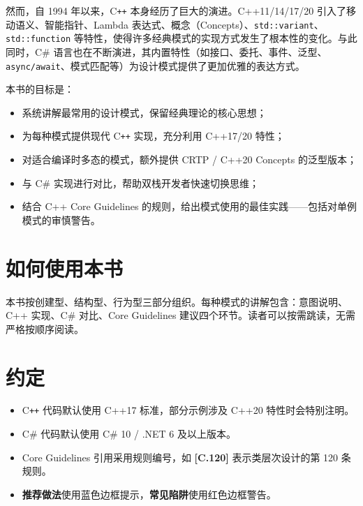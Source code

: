 \documentclass[12pt,a4paper,fontset=fandol]{ctexbook}
\newcommand{\guideref}[1]{\textbf{\textcolor{blue!70!black}{[#1]}}}
\begin{document}
然而，自 1994 年以来，C\texttt{++} 本身经历了巨大的演进。C++11/14/17/20 引入了移动语义、智能指针、Lambda 表达式、概念（Concepts）、\texttt{std::variant}、\texttt{std::function} 等特性，使得许多经典模式的实现方式发生了根本性的变化。与此同时，C\# 语言也在不断演进，其内置特性（如接口、委托、事件、泛型、\texttt{async/await}、模式匹配等）为设计模式提供了更加优雅的表达方式。

本书的目标是：

\begin{itemize}
  \item 系统讲解最常用的设计模式，保留经典理论的核心思想；
  \item 为每种模式提供现代 C\texttt{++} 实现，充分利用 C++17/20 特性；
  \item 对适合编译时多态的模式，额外提供 CRTP / C++20 Concepts 的泛型版本；
  \item 与 C\# 实现进行对比，帮助双栈开发者快速切换思维；
  \item 结合 C++ Core Guidelines 的规则，给出模式使用的最佳实践——包括对单例模式的审慎警告。
\end{itemize}

\section*{如何使用本书}

本书按创建型、结构型、行为型三部分组织。每种模式的讲解包含：意图说明、C++ 实现、C\# 对比、Core Guidelines 建议四个环节。读者可以按需跳读，无需严格按顺序阅读。

\section*{约定}

\begin{itemize}
  \item C\texttt{++} 代码默认使用 C++17 标准，部分示例涉及 C++20 特性时会特别注明。
  \item C\# 代码默认使用 C\# 10 / .NET 6 及以上版本。
  \item Core Guidelines 引用采用规则编号，如 \guideref{C.120} 表示类层次设计的第 120 条规则。
  \item \textbf{推荐做法}使用蓝色边框提示，\textbf{常见陷阱}使用红色边框警告。
\end{itemize}

\tableofcontents

\mainmatter
\end{document}
